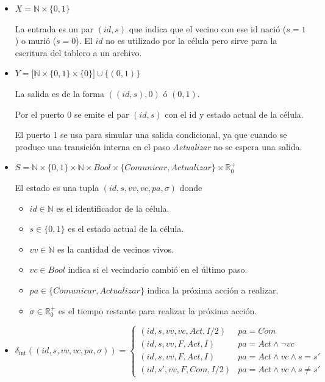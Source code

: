 \documentclass[12pt]{article}
\newcommand{\dint}{\delta_{\text{int}}}
\newcommand{\estado}{(id, s, vv, vc, pa, \sigma)}
\newcommand{\R}{\mathbb{R}}
\newcommand{\N}{\mathbb{N}}
\begin{document}
\begin{itemize}
  \item $X = \N \times \{0,1\}$

    La entrada es un par $(id, s)$ que indica que el vecino con ese id nació ($s=1$) o murió ($s=0$). El $id$ no es utilizado por la célula pero sirve para la escritura del tablero a un archivo.

  \item $Y = \big[\N \times \{0,1\} \times \{0\} \big] \cup \{(0, 1)\}$

    La salida es de la forma $((id, s), 0)$ ó $(0, 1)$.

    Por el puerto 0 se emite el par $(id, s)$ con el id y estado actual de la célula.

    El puerto 1 se usa para simular una salida condicional, ya que cuando se produce una transición interna en el paso \textit{Actualizar} no se espera una salida.

  \item $S = \N \times \{0, 1\} \times \N \times Bool \times \{Comunicar, Actualizar\} \times \R_0^+$

    El estado es una tupla $(id, s, vv, vc, pa, \sigma)$ donde

    \begin{itemize}
      \item $id \in \N$ es el identificador de la célula.
      \item $s \in \{0, 1\}$ es el estado actual de la célula.
      \item $vv \in \N$ es la cantidad de vecinos vivos.
      \item $vc \in Bool$ indica si el vecindario cambió en el último paso.
      \item $pa \in \{Comunicar, Actualizar\}$ indica la próxima acción a realizar.
      \item $\sigma \in \R_0^+$ es el tiempo restante para realizar la próxima acción.
    \end{itemize}

  \item $\dint(\estado) = \begin{cases}
      (id, s, vv, vc, Act, I/2) & pa = Com \\
      (id, s, vv, F, Act, I) & pa = Act \land \lnot vc \\
      (id, s, vv, F, Act, I) & pa = Act \land vc \land s = s' \\
      (id, s', vv, F, Com, I/2) & pa = Act \land vc \land s \neq s'
    \end{cases}$


\end{itemize}
\end{document}
